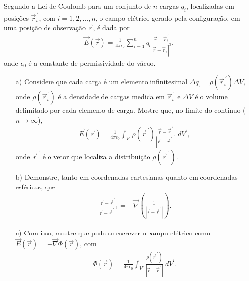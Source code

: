 \documentclass[a4paper,12pt]{article}
\begin{document}
\indent \par Segundo a Lei de Coulomb para um conjunto de $n$ cargas $q_{i}$, localizadas em posições $\vec{r}_{i}^{~'}$, com $i=1,2,...,n$, o campo elétrico gerado pela configuração, em uma posição de observação $\vec{r}$, é dada por
%
\begin{eqnarray}
\nonumber
\vec{E}(\vec{r}) = \frac{1}{4\pi \epsilon_{0}} \sum_{i=1}^{n} q_{i} \frac{\vec{r}-\vec{r}^{~'}_{i}}{|\vec{r}-\vec{r}_{i}^{~'}|^{3}}.
\end{eqnarray}
%
\noindent onde $\epsilon_{0}$ é a constante de permissividade do vácuo.
\begin{itemize}
 \item[a)] Considere que cada carga é um elemento infinitesimal $\Delta q_{i} = \rho(\vec{r}_{i}^{~'}) \Delta V$, onde $\rho(\vec{r}_{i}^{~'})$ é a densidade de cargas medida em $\vec{r}_{i}^{~'}$ e $\Delta V$ é o volume delimitado por cada elemento de carga. Mostre que, no limite do contínuo ($n \rightarrow \infty$),
 \begin{eqnarray}
\nonumber
\vec{E}(\vec{r}) = \frac{1}{4\pi \epsilon_{0}} \int_{V'} \rho(\vec{r}^{~'}) \frac{\vec{r}-\vec{r}^{~'}}{|\vec{r}-\vec{r}^{~'}|^{3}} ~dV^{'},
\end{eqnarray}
%
\noindent onde $\vec{r}^{~'}$ é o vetor que localiza a distribuição $\rho(\vec{r}^{~'})$.
%
\item[b)] Demonstre, tanto em coordenadas cartesianas quanto em coordenadas esféricas, que
%
\begin{eqnarray}
\nonumber
\frac{\vec{r}-\vec{r}^{~'}}{|\vec{r}-\vec{r}^{~'}|^{3}} = - \vec{\nabla} \left( \frac{1}{|\vec{r}-\vec{r}^{~'}|} \right).
\end{eqnarray}
%
\item[c)] Com isso, mostre que pode-se escrever o campo elétrico como $\vec{E}(\vec{r}) = -\vec{\nabla}\Phi(\vec{r})$, com
\begin{eqnarray}
\nonumber
\Phi(\vec{r}) = \frac{1}{4\pi \epsilon_{0}} \int_{V'} \frac{\rho(\vec{r}^{~'})}{|\vec{r}-\vec{r}^{~'}|} ~dV^{'}.\\
\nonumber
\end{eqnarray}
%
\end{itemize}

\end{document}
